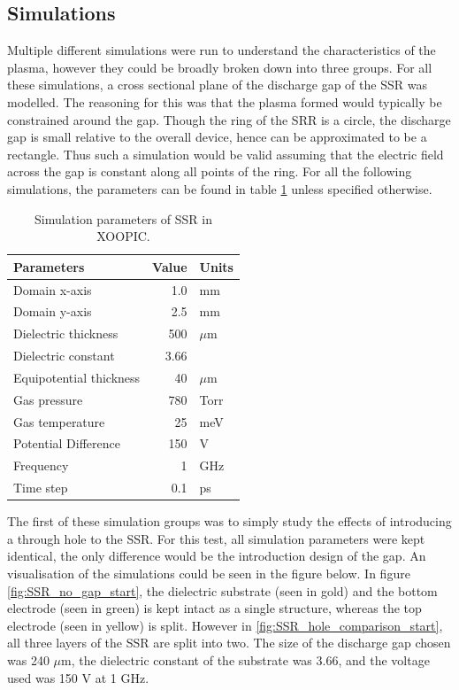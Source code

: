 \subsection{Simulations}

Multiple different simulations were run to understand the characteristics of the plasma, however they could be broadly broken down into three groups. For all these simulations, a cross sectional plane of the discharge gap of the SSR was modelled. The reasoning for this was that the plasma formed would typically be constrained around the gap. Though the ring of the SRR is a circle, the discharge gap is small relative to the overall device, hence can be approximated to be a rectangle. Thus such a simulation would be valid assuming that the electric field across the gap is constant along all points of the ring. For all the following simulations, the parameters can be found in table \ref{tb:basic_simulation_parameters} unless specified otherwise.

\begin{table}[h!]
	\caption{Simulation parameters of SSR in XOOPIC.}
	\vspace{3 pt}
	\centering
	\begin{tabular}{l r l}
		Parameters               & Value    & Units  \\
		\hline 
		Domain x-axis            & 1.0      & mm     \\
		Domain y-axis            & 2.5  	& mm     \\
		Dielectric thickness     & 500      & $\mu$m \\
		Dielectric constant      & 3.66     &        \\
		Equipotential thickness  & 40       & $\mu$m \\
		Gas pressure             & 780      & Torr   \\
		Gas temperature          & 25       & meV    \\
		Potential Difference     & 150      & V      \\
		Frequency                & 1        & GHz    \\
		Time step                & 0.1      & ps
	\end{tabular}
	\label{tb:basic_simulation_parameters}
\end{table}

The first of these simulation groups was to simply study the effects of introducing a through hole to the SSR. For this test, all simulation parameters were kept identical, the only difference would be the introduction design of the gap. An visualisation of the simulations could be seen in the figure below. In figure \ref{fig:SSR_no_gap_start}, the dielectric substrate (seen in gold) and the bottom electrode (seen in green) is kept intact as a single structure, whereas the top electrode (seen in yellow) is split. However in \ref{fig:SSR_hole_comparison_start}, all three layers of the SSR are split into two. The size of the discharge gap chosen was 240 $\mu$m, the dielectric constant of the substrate was 3.66, and the voltage used was 150 V at 1 GHz. 

